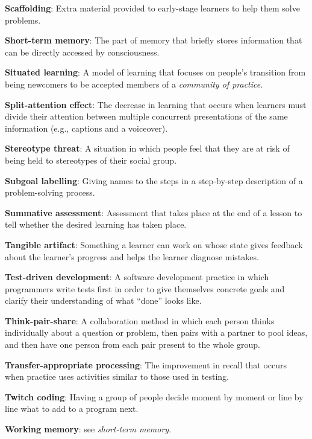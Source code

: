 \textbf{\hypertarget{g:scaffolding}{Scaffolding}\label{g:scaffolding}}: Extra material provided to
early-stage learners to help them solve problems.

\textbf{\hypertarget{g:short-term-memory}{Short-term memory}\label{g:short-term-memory}}: The part of memory
that briefly stores information that can be directly accessed by
consciousness.

\textbf{\hypertarget{g:situated-learning}{Situated learning}\label{g:situated-learning}}: A model of learning
that focuses on people's transition from being newcomers to be accepted
members of a \emph{community of practice}.

\textbf{\hypertarget{g:split-attention-effect}{Split-attention effect}\label{g:split-attention-effect}}: The
decrease in learning that occurs when learners must divide their
attention between multiple concurrent presentations of the same
information (e.g., captions and a voiceover).

\textbf{\hypertarget{g:stereotype-threat}{Stereotype threat}\label{g:stereotype-threat}}: A situation in
which people feel that they are at risk of being held to stereotypes of
their social group.

\textbf{\hypertarget{g:subgoal-labelling}{Subgoal labelling}\label{g:subgoal-labelling}}: Giving names to the
steps in a step-by-step description of a problem-solving process.

\textbf{\hypertarget{g:summative-assessment}{Summative assessment}\label{g:summative-assessment}}: Assessment
that takes place at the end of a lesson to tell whether the desired
learning has taken place.

\textbf{\hypertarget{g:tangible-artifact}{Tangible artifact}\label{g:tangible-artifact}}: Something a learner
can work on whose state gives feedback about the learner's progress and
helps the learner diagnose mistakes.

\textbf{\hypertarget{g:test-driven-development}{Test-driven development}\label{g:test-driven-development}}: A
software development practice in which programmers write tests first in
order to give themselves concrete goals and clarify their understanding
of what ``done'' looks like.

\textbf{\hypertarget{g:think-pair-share}{Think-pair-share}\label{g:think-pair-share}}: A collaboration
method in which each person thinks individually about a question or
problem, then pairs with a partner to pool ideas, and then have one
person from each pair present to the whole group.

\textbf{\hypertarget{g:transfer-appropriate-processing}{Transfer-appropriate processing}\label{g:transfer-appropriate-processing}}:
The improvement in recall that occurs when practice uses activities
similar to those used in testing.

\textbf{\hypertarget{g:twitch-coding}{Twitch coding}\label{g:twitch-coding}}: Having a group of people
decide moment by moment or line by line what to add to a program next.

\textbf{\hypertarget{g:working-memory}{Working memory}\label{g:working-memory}}: see \emph{short-term memory}.
